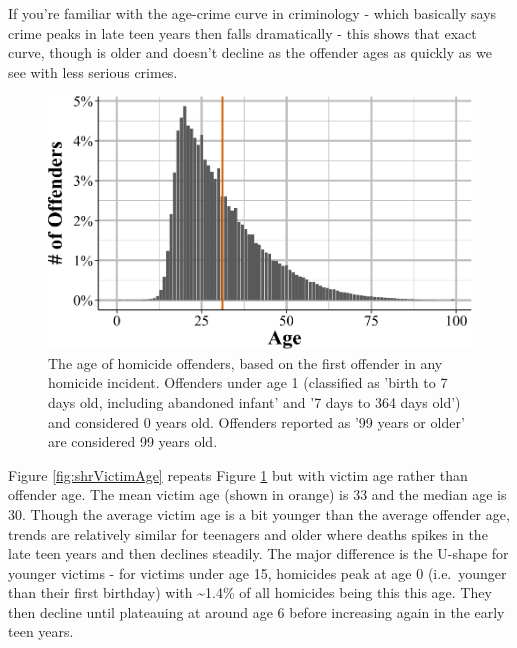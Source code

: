 \documentclass[
  12pt,
  openany]{book}
\begin{document}
If you're familiar with the age-crime curve in criminology - which basically says crime peaks in late teen years then falls dramatically - this shows that exact curve, though is older and doesn't decline as the offender ages as quickly as we see with less serious crimes.

\begin{figure}

{\centering \includegraphics[width=0.9\linewidth]{06_shr_files/figure-latex/shrOffenderAge-1} 

}

\caption{The age of homicide offenders, based on the first offender in any homicide incident. Offenders under age 1 (classified as 'birth to 7 days old, including abandoned infant' and '7 days to 364 days old') and considered 0 years old. Offenders reported as '99 years or older' are considered 99 years old.}\label{fig:shrOffenderAge}
\end{figure}

Figure \ref{fig:shrVictimAge} repeats Figure \ref{fig:shrOffenderAge} but with victim age rather than offender age. The mean victim age (shown in orange) is 33 and the median age is 30. Though the average victim age is a bit younger than the average offender age, trends are relatively similar for teenagers and older where deaths spikes in the late teen years and then declines steadily. The major difference is the U-shape for younger victims - for victims under age 15, homicides peak at age 0 (i.e.~younger than their first birthday) with \textasciitilde1.4\% of all homicides being this this age. They then decline until plateauing at around age 6 before increasing again in the early teen years.
\end{document}
